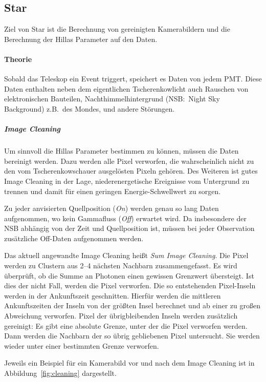 \subsection{Star}%
\label{sub:star}
Ziel von Star ist die Berechnung von gereinigten Kamerabildern und die Berechnung
der Hillas Parameter auf den Daten.

\paragraph{Theorie}
Sobald das Teleskop ein Event triggert,
speichert es Daten von jedem PMT.\@
Diese Daten enthalten neben dem eigentlichen Tscherenkowlicht auch
Rauschen von elektronischen Bauteilen,
Nachthimmelhintergrund (NSB:\ Night Sky Background) z.B.\ des Mondes,
und andere Störungen.

\subparagraph{Image Cleaning}
Um sinnvoll die Hillas Parameter bestimmen zu können,
müssen die Daten bereinigt werden.
Dazu werden alle Pixel verworfen, die wahrscheinlich nicht zu den
vom Tscherenkowschauer ausgelösten Pixeln gehören.
Des Weiteren ist gutes Image Cleaning in der Lage,
niederenergetische Ereignisse vom Untergrund zu trennen und damit
für einen geringen Energie-Schwellwert zu sorgen.

Zu jeder anvisierten Quellposition (\textit{On}) werden
genau so lang Daten aufgenommen,
wo kein Gammafluss (\textit{Off}) erwartet wird.
Da insbesondere der NSB abhängig von der Zeit und Quellposition ist,
müssen bei jeder Observation zusätzliche Off-Daten aufgenommen werden.

Das aktuell angewandte Image Cleaning heißt \textit{Sum Image Cleaning}.
Die Pixel werden zu Clustern aus 2--4 nächsten Nachbarn zusammengefasst.
Es wird überprüft, ob die Summe an Photonen einen gewissen Grenzwert
übersteigt.
Ist dies der nicht Fall, werden die Pixel verworfen.
Die so entstehenden Pixel-Inseln werden in der Ankunftszeit geschnitten.
Hierfür werden die mittleren Ankunftszeiten der Inseln von der größten Insel
berechnet und ab einer zu großen Abweichung verworfen.
Pixel der übrigbleibenden Inseln werden zusätzlich gereinigt:
Es gibt eine absolute Grenze, unter der die Pixel verworfen werden.
Dann werden die Nachbarn der so übrig gebliebenen Pixel untersucht.
Sie werden wieder unter einer bestimmten Grenze verworfen.

Jeweils ein Beispiel für ein Kamerabild vor und nach dem Image Cleaning ist in
Abbildung~\ref{fig:cleaning} dargestellt.

